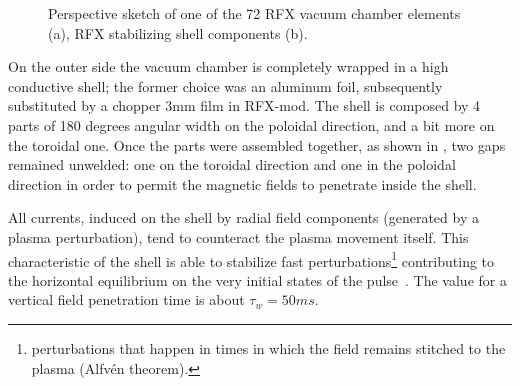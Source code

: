 \begin{figure}[ht!]
\centering
{}
\caption{ Perspective sketch of one of the 72 RFX vacuum chamber elements (a), RFX stabilizing shell components (b). }
\end{figure}


On the outer side the vacuum chamber is completely wrapped in a high conductive shell; the former choice was an aluminum foil, subsequently substituted by a chopper 3mm film in RFX-mod. The shell is composed by 4 parts of 180 degrees angular width on the poloidal direction, and a bit more on the toroidal one. Once the parts were assembled together, as shown in \Figure{\ref{fig:rfx_shell}}, two gaps remained unwelded: one on the toroidal direction and one in the poloidal direction in order to permit the magnetic fields to penetrate inside the shell\cite{th13}.

All currents, induced on the shell by radial field components (generated by a plasma perturbation), tend to counteract the plasma movement itself. This characteristic of the shell is able to stabilize fast perturbations\footnote{perturbations that happen in times in which the field remains stitched to the plasma (Alfv\'en theorem).} contributing to the horizontal equilibrium on the very initial states of the pulse~\cite{th19}. The value for a vertical field penetration time is about $\tau_w = 50 ms$\cite{th12}.


